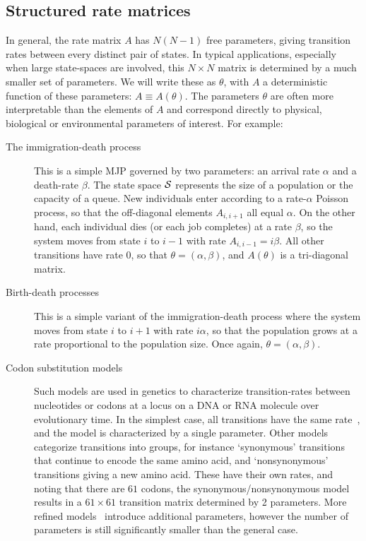 \subsection{Structured rate matrices}
In general, the rate matrix $A$ has $N(N-1)$ free parameters,
giving transition rates between every distinct pair of states. 
In typical applications, especially when large state-spaces
are involved, this $N \times N$ matrix is determined by a much smaller
set of parameters. We will write these as $\theta$, with
$A$ a deterministic function of these parameters: 
$A \equiv A(\theta)$. The parameters $\theta$ are often more 
interpretable than the elements of $A$ and correspond directly to
physical, biological or environmental parameters of interest. 
For example:
\begin{description}
  \item[The immigration-death process] This is a simple MJP governed
    by two parameters: an arrival rate $\alpha$ and a death-rate
    $\beta$. The state space ${\mathcal S}$ represents the size of a 
    population or the capacity of a queue. New individuals
    enter according to a rate-$\alpha$ Poisson process,
    so that the off-diagonal elements $A_{i,i+1}$ all equal $\alpha$.
    On the other hand, each individual dies (or each job completes) 
    at a rate $\beta$, so the system moves from state $i$ to 
    $i-1$ with rate $A_{i,i-1}=i\beta$.
    All other transitions have rate $0$, so that $\theta = (\alpha,\beta)$,
    and $A(\theta)$ is a tri-diagonal matrix.
  \item[Birth-death processes] This is a simple variant of the
    immigration-death process where the system moves from state $i$ 
    to $i+1$ with rate $i\alpha$, so that the population grows at a 
    rate proportional to the population size. Once again, 
    $\theta=(\alpha,\beta)$.
  \item[Codon substitution models] Such models are used in genetics
    to characterize transition-rates between nucleotides or codons at a locus on
    a DNA or RNA molecule over evolutionary time. In the simplest case,
    all transitions have the same rate~\cite{jukescantor69}, and the model is 
    characterized by a single parameter. Other models categorize transitions 
    into groups, for instance `synonymous' transitions that continue to 
    encode the same amino acid, and `nonsynonymous' transitions giving 
    a new amino acid.  These have their own rates, and noting that 
    there are $61$ codons, the synonymous/nonsynonymous model results in a 
    $61\times 61$ transition matrix determined by 2 parameters. More refined 
    models~\cite{goldman1994codon} introduce additional parameters, however the 
    number of parameters is still significantly smaller than the general case.
\end{description}
